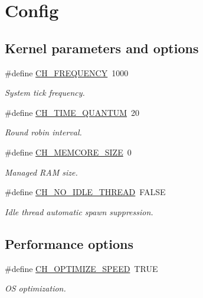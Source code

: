 \hypertarget{group__config}{}\section{Config}
\label{group__config}
\subsection*{Kernel parameters and options}
\begin{DoxyCompactItemize}
\item 
\#define \hyperlink{group__config_ga195ab8ff3340a18d4513cbaf915078f2}{C\+H\+\_\+\+F\+R\+E\+Q\+U\+E\+N\+C\+Y}~1000
\begin{DoxyCompactList}\small\item\em System tick frequency. \end{DoxyCompactList}\item 
\#define \hyperlink{group__config_ga3c6800242611cf244a38c4a870e8515a}{C\+H\+\_\+\+T\+I\+M\+E\+\_\+\+Q\+U\+A\+N\+T\+U\+M}~20
\begin{DoxyCompactList}\small\item\em Round robin interval. \end{DoxyCompactList}\item 
\#define \hyperlink{group__config_gac73902e3c40b375483f9dde71e83253d}{C\+H\+\_\+\+M\+E\+M\+C\+O\+R\+E\+\_\+\+S\+I\+Z\+E}~0
\begin{DoxyCompactList}\small\item\em Managed R\+A\+M size. \end{DoxyCompactList}\item 
\#define \hyperlink{group__config_gac7ceed3b75958cb6f7a977aab5ee249f}{C\+H\+\_\+\+N\+O\+\_\+\+I\+D\+L\+E\+\_\+\+T\+H\+R\+E\+A\+D}~F\+A\+L\+S\+E
\begin{DoxyCompactList}\small\item\em Idle thread automatic spawn suppression. \end{DoxyCompactList}\end{DoxyCompactItemize}
\subsection*{Performance options}
\begin{DoxyCompactItemize}
\item 
\#define \hyperlink{group__config_gaa5a3d403206b04dfa43ee769e8a220c6}{C\+H\+\_\+\+O\+P\+T\+I\+M\+I\+Z\+E\+\_\+\+S\+P\+E\+E\+D}~T\+R\+U\+E
\begin{DoxyCompactList}\small\item\em O\+S optimization. \end{DoxyCompactList}\end{DoxyCompactItemize}
